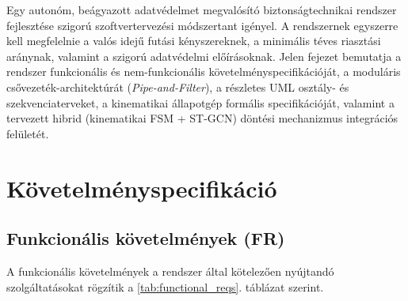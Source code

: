 \documentclass[12pt,a4paper,oneside]{report}
\begin{document}
Egy autonóm, beágyazott adatvédelmet megvalósító biztonságtechnikai rendszer fejlesztése szigorú szoftvertervezési módszertant igényel. A rendszernek egyszerre kell megfelelnie a valós idejű futási kényszereknek, a minimális téves riasztási aránynak, valamint a szigorú adatvédelmi előírásoknak. Jelen fejezet bemutatja a rendszer funkcionális és nem-funkcionális követelményspecifikációját, a moduláris csővezeték-architektúrát (\textit{Pipe-and-Filter}), a részletes UML osztály- és szekvenciaterveket, a kinematikai állapotgép formális specifikációját, valamint a tervezett hibrid (kinematikai FSM + ST-GCN) döntési mechanizmus integrációs felületét.

\section{Követelményspecifikáció}

\subsection{Funkcionális követelmények (FR)}
A funkcionális követelmények a rendszer által kötelezően nyújtandó szolgáltatásokat rögzítik a \ref{tab:functional_reqs}. táblázat szerint.
\end{document}
